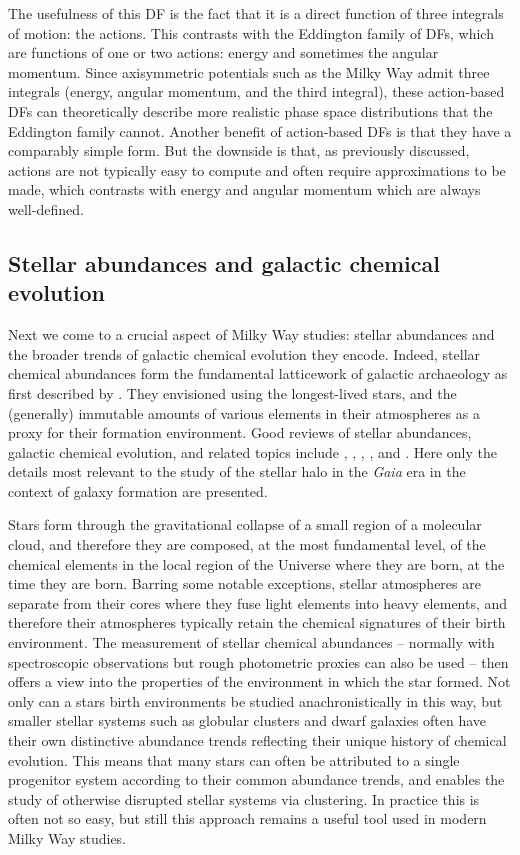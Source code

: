 The usefulness of this DF is the fact that it is a direct function of three integrals of motion: the actions. This contrasts with the Eddington family of DFs, which are functions of one or two actions: energy and sometimes the angular momentum. Since axisymmetric potentials such as the Milky Way admit three integrals (energy, angular momentum, and the third integral), these action-based DFs can theoretically describe more realistic phase space distributions that the Eddington family cannot. Another benefit of action-based DFs is that they have a comparably simple form. But the downside is that, as previously discussed, actions are not typically easy to compute and often require approximations to be made, which contrasts with energy and angular momentum which are always well-defined.

\subsection{Stellar abundances and galactic chemical evolution}

Next we come to a crucial aspect of Milky Way studies: stellar abundances and the broader trends of galactic chemical evolution they encode. Indeed, stellar chemical abundances form the fundamental latticework of galactic archaeology as first described by \textcite{freeman02}. They envisioned using the longest-lived stars, and the (generally) immutable amounts of various elements in their atmospheres as a proxy for their formation environment. Good reviews of stellar abundances, galactic chemical evolution, and related topics include  \textcite{tolstoy09}, \textcite{asplund09}, \textcite{nomoto13}, \textcite{frebel15}, and \textcite{kobayashi23}. Here only the details most relevant to the study of the stellar halo in the \textit{Gaia} era in the context of galaxy formation are presented.

Stars form through the gravitational collapse of a small region of a molecular cloud, and therefore they are composed, at the most fundamental level, of the chemical elements in the local region of the Universe where they are born, at the time they are born. Barring some notable exceptions, stellar atmospheres are separate from their cores where they fuse light elements into heavy elements, and therefore their atmospheres typically retain the chemical signatures of their birth environment. The measurement of stellar chemical abundances -- normally with spectroscopic observations but rough photometric proxies can also be used -- then offers a view into the properties of the environment in which the star formed. Not only can a stars birth environments be studied anachronistically in this way, but smaller stellar systems such as globular clusters and dwarf galaxies often have their own distinctive abundance trends reflecting their unique history of chemical evolution. This means that many stars can often be attributed to a single progenitor system according to their common abundance trends, and enables the study of otherwise disrupted stellar systems via clustering. In practice this is often not so easy, but still this approach remains a useful tool used in modern Milky Way studies.


